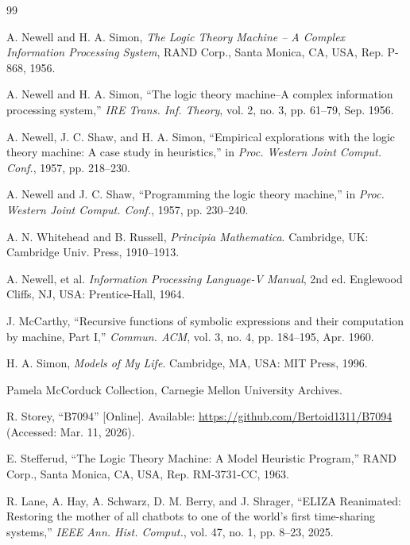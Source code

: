\documentclass[journal]{IEEEtran}
\begin{document}
\begin{thebibliography}{99}

 A. Newell and H. A. Simon, \textit{The Logic Theory
  Machine -- A Complex Information Processing System}, RAND Corp.,
  Santa Monica, CA, USA, Rep. P-868, 1956.

 A. Newell and H. A. Simon, ``The logic theory
  machine--A complex information processing system,'' \textit{IRE
  Trans. Inf. Theory}, vol. 2, no. 3, pp. 61--79, Sep. 1956.

 A. Newell, J. C. Shaw, and H. A. Simon, ``Empirical
  explorations with the logic theory machine: A case study in
  heuristics,'' in \textit{Proc. Western Joint Comput. Conf.}, 1957,
  pp. 218--230.

 A. Newell and J. C. Shaw, ``Programming the
  logic theory machine,'' in \textit{Proc. Western Joint
  Comput. Conf.}, 1957, pp. 230--240.

 A. N. Whitehead and B. Russell,
  \textit{Principia Mathematica}. Cambridge, UK: Cambridge
  Univ. Press, 1910--1913.

 A. Newell, et al. \textit{Information
  Processing Language-V Manual}, 2nd ed. Englewood Cliffs, NJ, USA:
  Prentice-Hall, 1964.

 J. McCarthy, ``Recursive functions of
  symbolic expressions and their computation by machine, Part I,''
  \textit{Commun. ACM}, vol. 3, no. 4, pp. 184--195, Apr. 1960.

 H. A. Simon, \textit{Models of My Life}.
  Cambridge, MA, USA: MIT Press, 1996.

  Pamela McCorduck Collection, Carnegie Mellon University Archives.

 R. Storey, ``B7094'' [Online]. Available:
  \url{https://github.com/Bertoid1311/B7094} (Accessed: Mar. 11,
  2026).

 E. Stefferud, ``The Logic Theory Machine: A
  Model Heuristic Program,'' RAND Corp., Santa Monica, CA, USA,
  Rep. RM-3731-CC, 1963.

 R. Lane, A. Hay, A. Schwarz, D. M. Berry, and
  J. Shrager, ``ELIZA Reanimated: Restoring the mother of all chatbots
  to one of the world's first time-sharing systems,'' \textit{IEEE
    Ann. Hist. Comput.}, vol. 47, no. 1, pp. 8--23, 2025.


\end{thebibliography}
\end{document}
